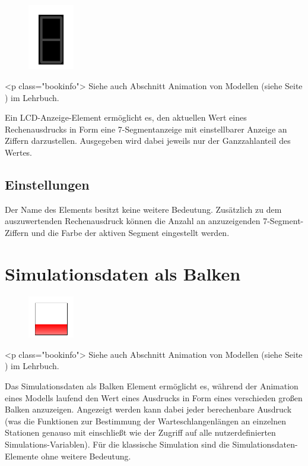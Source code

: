 \begin{figure}
\vspace{-22pt}
\includegraphics[width=2cm]{imageModelElementAnimationLCD.png}
\vspace{-22pt}
\end{figure}

<p class="bookinfo">
Siehe auch Abschnitt Animation von Modellen (siehe Seite \pageref{ref:book:5.4.3}) im Lehrbuch.

Ein LCD-Anzeige-Element ermöglicht es, den aktuellen Wert eines Rechenausdrucks
in Form eine 7-Segmentanzeige mit einstellbarer Anzeige an Ziffern darzustellen.
Ausgegeben wird dabei jeweils nur der Ganzzahlanteil des Wertes.

\subsection*{Einstellungen}

Der Name des Elements besitzt keine weitere Bedeutung.
Zusätzlich zu dem auszuwertenden Rechenausdruck können
die Anzahl an anzuzeigenden 7-Segment-Ziffern und die
Farbe der aktiven Segment eingestellt werden.


\section{Simulationsdaten als Balken}
\label{ref:ModelElementAnimationBar}

\begin{figure}
\vspace{-22pt}
\includegraphics[width=2cm]{imageModelElementAnimationBar.png}
\vspace{-22pt}
\end{figure}

<p class="bookinfo">
Siehe auch Abschnitt Animation von Modellen (siehe Seite \pageref{ref:book:5.4.3}) im Lehrbuch.

Das Simulationsdaten als Balken Element ermöglicht es, während der Animation eines Modells laufend den Wert
eines Ausdrucks in Form eines verschieden großen Balken anzuzeigen. Angezeigt werden kann dabei jeder berechenbare
Ausdruck (was die Funktionen zur Bestimmung der Warteschlangenlängen an einzelnen Stationen genauso mit einschließt
wie der Zugriff auf alle nutzerdefinierten Simulations-Variablen). Für die klassische Simulation sind die
Simulationsdaten-Elemente ohne weitere Bedeutung.


